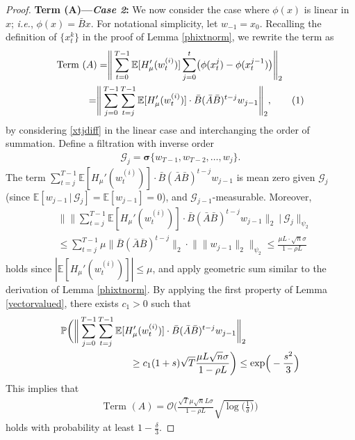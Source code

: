 \documentclass[letterpaper,10pt,conference]{ieeeconf}
\newcommand\numberthis{\addtocounter{equation}{1}\tag{\theequation}}
\theoremstyle{plain} %
\theoremstyle{plain} %
\theoremstyle{plain} %
\theoremstyle{plain}
\begin{document}
\begin{proof}
\textbf{Term (A)—\textit{Case 2}:}
We now consider the case where $\phi(x)$ is linear in $x$; \textit{i.e.}, $\phi(x) = \bar Bx$. For notational simplicity, let $w_{-1} = x_0$. Recalling the definition of $\{x_t^k\}$ in the proof of Lemma \ref{phixtnorm}, we rewrite the term as 
\begin{align*}
    \text{Term~}(&A)= \Biggr\|\sum_{t=0}^{T-1} \mathbb{E}[H_\mu'(w_t^{(i)})]  \sum_{j=0}^{t}\bigr( \phi(x_t^{j})-\phi(x_t^{j-1}) \bigr)\Biggr\|_2 \\&= \Biggr\|\sum_{j=0}^{T-1} \sum_{t=j}^{T-1} \mathbb{E}[H_\mu'(w_t^{(i)})]\cdot \bar B (\bar A\bar B)^{t-j} w_{j-1}\Biggr\|_2,\numberthis\label{termcrewrite}
\end{align*}
by considering \eqref{xtjdiff} in the linear case and interchanging the order of summation.  
   Define a filtration with inverse order
\begin{align*}
    \mathcal{G}_j = \bm{\sigma}\{w_{T-1}, w_{T-2}, \dots, w_j\}. 
\end{align*}
The term $\sum_{t=j}^{T-1} \mathbb{E}[H_\mu'(w_t^{(i)})]\cdot \bar B (\bar A\bar B)^{t-j} w_{j-1}$ is mean zero given $\mathcal{G}_j$ (since $\mathbb{E}[w_{j-1}\,|\,\mathcal{G}_j]=\mathbb{E}[w_{j-1}]=0$), and $\mathcal{G}_{j-1}$-measurable. Moreover, 
\begin{align*}
  &\Biggr \|  \biggr\|  \sum_{t=j}^{T-1} \mathbb{E}[H_\mu'(w_t^{(i)})]\cdot \bar B (\bar A\bar B)^{t-j} w_{j-1}\biggr\|_2   ~\biggr|~\mathcal{G}_j \Biggr\|_{\psi_2} \\&\le   \sum_{t=j}^{T-1}\mu  \|\bar B (\bar A\bar B)^{t-j}\|_2 \cdot \bigr\|\|w_{j-1}\|_2\bigr\| _{\psi_2}\le \frac{\mu L\cdot \sqrt{n} \sigma }{1-\rho L}
\end{align*}
holds since $|\mathbb{E}[H_\mu'(w_t^{(i)})]| \le \mu$, and apply geometric sum similar to the derivation of Lemma \ref{phixtnorm}.  
By applying the first property of Lemma \ref{vectorvalued}, there exists $c_1>0$ such that
\begin{align*}
   & \mathbb{P}\biggr( \biggr\|\sum_{j=0}^{T-1} \sum_{t=j}^{T-1} \mathbb{E}[H_\mu'(w_t^{(i)})]\cdot \bar B (\bar A\bar B)^{t-j} w_{j-1}\biggr\|_2\\&\hspace{25mm}\ge c_1 (1+s)\sqrt{T} \frac{\mu L \sqrt{n} \sigma}{1-\rho L}   \biggr) \le \exp\Bigr(-\frac{s^2}{3}\Bigr)
\end{align*}
This implies that 
\begin{align}\label{termA}
    \text{Term~}(A)= \mathcal{O}\biggr(  \frac{\sqrt{T}\mu \sqrt{n} L\sigma}{1-\rho L}\sqrt{\log\Bigr(\frac{1}{\delta}\Bigr)}\biggr)
\end{align}
holds with probability at least $1-\frac{\delta}{3}$. 


\end{proof}
\end{document}
